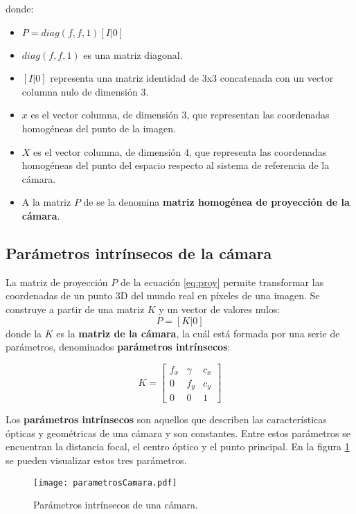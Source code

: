 donde:
\begin{itemize}
\item $P = diag(f, f, 1) [I|0]$
\item $diag(f, f, 1)$ es una matriz diagonal.
\item $[I|0]$ representa una matriz identidad de 3x3 concatenada con un vector columna nulo de dimensión 3.
\item $x$  es el vector columna, de dimensión 3, que representan las coordenadas homogéneas del punto de la imagen.
\item $X$  es el vector columna, de dimensión 4, que representa las coordenadas homogéneas del punto del espacio respecto al sistema de referencia de la cámara.
\item A la matriz $P$ de se la denomina \textbf{matriz homogénea de proyección de la cámara}.
\end{itemize}

\subsection{Parámetros intrínsecos de la cámara}
La matriz de proyección $P$ de la ecuación \ref{eq:proy} permite transformar las coordenadas de un punto 3D del mundo real en píxeles de una imagen. Se construye a partir de una matriz $K$ y un vector de valores nulos:
\begin{equation}
  P = [K|0] 
\end{equation}
donde la $K$ es la \textbf{matriz de la cámara}, la cuál está formada por una serie de parámetros, denominados \textbf{parámetros intrínsecos}:

\begin{equation}
  K =
  \begin{bmatrix}
    f_{x} & \gamma & {c_{x}} \\
    {0}&{f_{y}}&{c_{y}}\\
    {0}&{0}&{1}
  \end{bmatrix}
\end{equation}

Los \textbf{parámetros intrínsecos} son aquellos que describen las características ópticas y geométricas de una cámara y son constantes. Entre estos parámetros se encuentran la distancia focal, el centro óptico y el punto principal. En la figura \ref{fig:FIGparamCam} se pueden visualizar estos tres parámetros.

\begin{figure}[h]
  \centering
  \texttt{[image: parametrosCamara.pdf]}
  \caption{Parámetros intrínsecos de una cámara.}
  \label{fig:FIGparamCam}
\end{figure}

